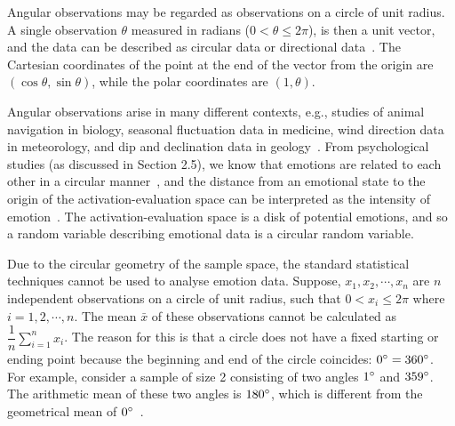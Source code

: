 \documentclass[10pt,journal,cspaper,compsoc]{IEEEtran}
\begin{document}
Angular observations may be regarded as observations on a circle of unit radius. A single observation $\theta$ measured in radians ($0<\theta \leq 2\pi$), is then a unit vector, and the data can be described as circular data or directional data~\cite{mardia1972statistics}. The Cartesian coordinates of the point at the end of the vector from the origin are $(\cos\theta, \sin\theta)$, while the polar coordinates are $(1, \theta)$. 

Angular observations arise in many different contexts, e.g., studies of animal navigation in biology, seasonal fluctuation data in medicine, wind direction data in meteorology, and dip and declination data in geology~\cite{gill2010circular}. From psychological studies (as discussed in Section 2.5), we know that emotions are related to each other in a circular manner~\cite{plutchik1980emotion}, and the distance from an emotional state to the origin of the activation-evaluation space can be interpreted as the intensity of emotion~\cite{russell1997shall}. The activation-evaluation space is a disk of potential emotions, and so a random variable describing emotional data is a circular random variable.

Due to the circular geometry of the sample space, the standard statistical techniques cannot be used to analyse emotion data. Suppose, $x_{1}, x_{2},\cdots ,x_{n}$ are $n$ independent observations on a circle of unit radius, such that $0< x_{i} \leq 2\pi$ where $i=1,2,\cdots, n$. The mean $\bar{x}$ of these observations cannot be calculated as $\dfrac{1}{n} \sum \limits_{i=1}^n x_{i}$. The reason for this is that a circle does not have a fixed starting or ending point because the beginning and end of the circle coincides: $0\degree = 360\degree$. For example, consider a sample of size 2 consisting of two angles $1\degree$ and $359\degree$. The arithmetic mean of these two angles is $180\degree$, which is different from the geometrical mean of $0\degree$~\cite{mardia1972statistics}.
\end{document}
